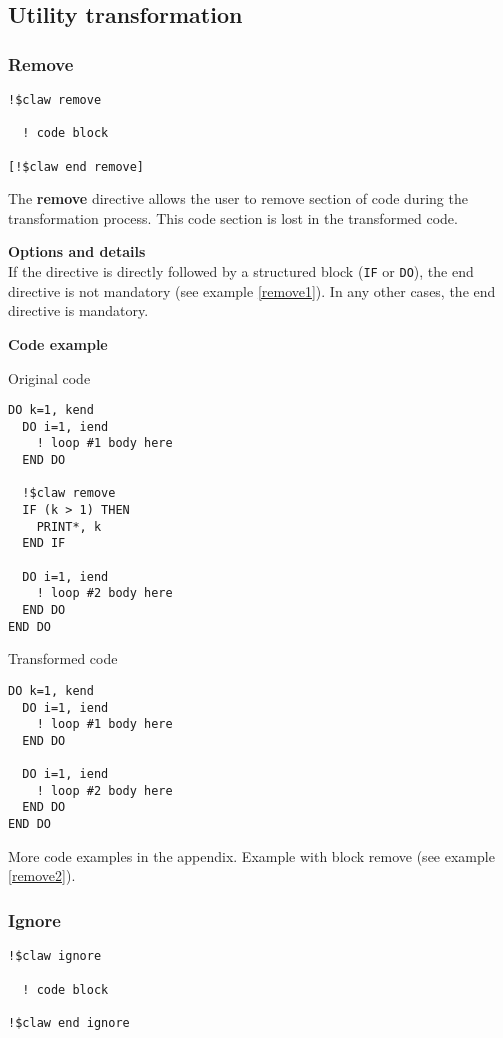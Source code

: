 \subsection{Utility transformation}

\subsubsection{Remove}
\begin{lstlisting}
!$claw remove

  ! code block
  
[!$claw end remove]
\end{lstlisting}

The \textbf{remove} directive allows the user to remove section of code
during the transformation process. This code section is lost in the 
transformed code.

\textbf{Options and details}\\
If the directive is directly followed by a structured block (\lstinline!IF! or \lstinline!DO!), the
end directive is not mandatory (see example \ref{remove1}). In any other cases, the end
directive is mandatory.

\textbf{Code example}
\label{remove1}

Original code
\begin{lstlisting}
DO k=1, kend
  DO i=1, iend
    ! loop #1 body here
  END DO

  !$claw remove
  IF (k > 1) THEN
    PRINT*, k
  END IF

  DO i=1, iend
    ! loop #2 body here
  END DO
END DO
\end{lstlisting}

Transformed code
\begin{lstlisting}
DO k=1, kend
  DO i=1, iend
    ! loop #1 body here
  END DO

  DO i=1, iend
    ! loop #2 body here
  END DO
END DO
\end{lstlisting}

More code examples in the appendix. Example with block remove (see example \ref{remove2}).


\subsubsection{Ignore}
\begin{lstlisting}
!$claw ignore

  ! code block
  
!$claw end ignore
\end{lstlisting}

